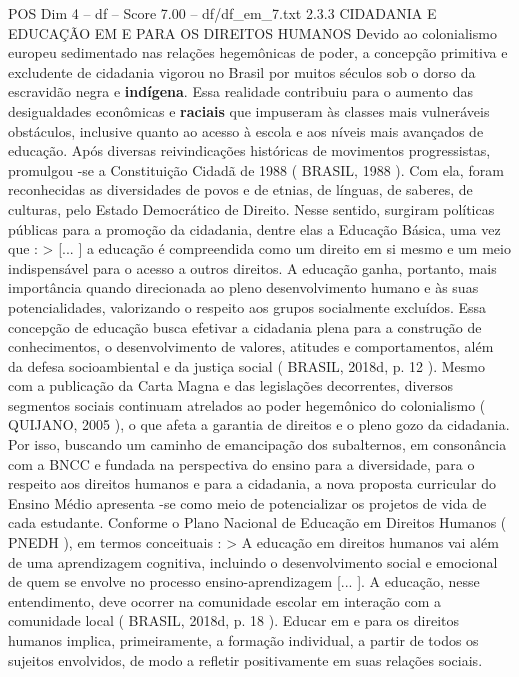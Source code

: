 \begin{textsample}{POS Dim 4 – df – Score 7.00 – df/df\_em\_7.txt}  \label{ex:f4_pos_228}
2.3.3 CIDADANIA E EDUCAÇÃO EM E PARA OS DIREITOS HUMANOS Devido ao colonialismo europeu sedimentado nas relações hegemônicas de poder, a concepção primitiva e excludente de cidadania vigorou no Brasil por muitos séculos sob o dorso da escravidão negra e \textbf{indígena}.
Essa realidade contribuiu para o aumento das desigualdades econômicas e \textbf{raciais} que impuseram às classes mais vulneráveis obstáculos, inclusive quanto ao acesso à escola e aos níveis mais avançados de educação.
Após diversas reivindicações históricas de movimentos progressistas, promulgou -se a Constituição Cidadã de 1988 ( BRASIL, 1988 ).
Com ela, foram reconhecidas as diversidades de povos e de etnias, de línguas, de saberes, de culturas, pelo Estado Democrático de Direito.
Nesse sentido, surgiram políticas públicas para a promoção da cidadania, dentre elas a Educação Básica, uma vez que : > [... ] a educação é compreendida como um direito em si mesmo e um meio indispensável para o acesso a outros direitos.
A educação ganha, portanto, mais importância quando direcionada ao pleno desenvolvimento humano e às suas potencialidades, valorizando o respeito aos grupos socialmente excluídos.
Essa concepção de educação busca efetivar a cidadania plena para a construção de conhecimentos, o desenvolvimento de valores, atitudes e comportamentos, além da defesa socioambiental e da justiça social ( BRASIL, 2018d, p. 12 ).
Mesmo com a publicação da Carta Magna e das legislações decorrentes, diversos segmentos sociais continuam atrelados ao poder hegemônico do colonialismo ( QUIJANO, 2005 ), o que afeta a garantia de direitos e o pleno gozo da cidadania.
Por isso, buscando um caminho de emancipação dos subalternos, em consonância com a BNCC e fundada na perspectiva do ensino para a diversidade, para o respeito aos direitos humanos e para a cidadania, a nova proposta curricular do Ensino Médio apresenta -se como meio de potencializar os projetos de vida de cada estudante.
Conforme o Plano Nacional de Educação em Direitos Humanos ( PNEDH ), em termos conceituais : > A educação em direitos humanos vai além de uma aprendizagem cognitiva, incluindo o desenvolvimento social e emocional de quem se envolve no processo ensino-aprendizagem [... ].
A educação, nesse entendimento, deve ocorrer na comunidade escolar em interação com a comunidade local ( BRASIL, 2018d, p. 18 ).
Educar em e para os direitos humanos implica, primeiramente, a formação individual, a partir de todos os sujeitos envolvidos, de modo a refletir positivamente em suas relações sociais.

\end{textsample}
